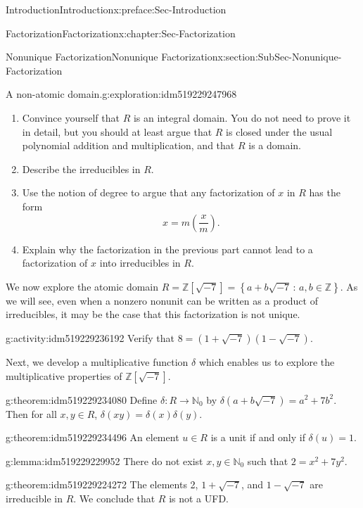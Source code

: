 \documentclass[oneside,10pt,]{book}
\numberwithin{equation}{section}
\newcommand{\setof}[2]{{\left\{#1\,\colon\,#2\right\}}}
\def\Z{{\mathbb Z}}
\def\N{{\mathbb N}}
\begin{document}
\begin{preface}{Introduction}{}{Introduction}{}{}{x:preface:Sec-Introduction}
\begin{chapterptx}{Factorization}{}{Factorization}{}{}{x:chapter:Sec-Factorization}
\begin{sectionptx}{Nonunique Factorization}{}{Nonunique Factorization}{}{}{x:section:SubSec-Nonunique-Factorization}
\begin{exploration}{A non-atomic domain.}{g:exploration:idm519229247968}
\begin{enumerate}
\item{}Convince yourself that \(R\) is an integral domain. You do not need to prove it in detail, but you should at least argue that \(R\) is closed under the usual polynomial addition and multiplication, and that \(R\) is a domain.%
\item{}Describe the irreducibles in \(R\).%
\item{}Use the notion of degree to argue that any factorization of \(x\) in \(R\) has the form%
\begin{equation*}
x = m\left(\frac{x}{m}\right).
\end{equation*}
%
\item{}Explain why the factorization in the previous part cannot lead to a factorization of \(x\) into irreducibles in \(R\).%
\end{enumerate}
\end{exploration}
We now explore the atomic domain \(R = \Z[\sqrt{-7}] = \setof{a+b\sqrt{-7}}{a,b\in\Z}\). As we will see, even when a nonzero nonunit can be written as a product of irreducibles, it may be the case that this factorization is not unique.%
\begin{activity}{}{g:activity:idm519229236192}%
Verify that \(8 = (1+\sqrt{-7})(1-\sqrt{-7})\).%
\end{activity}
Next, we develop a multiplicative function \(\delta\) which enables us to explore the multiplicative properties of \(\Z[\sqrt{-7}]\).%
\begin{theorem}{}{}{g:theorem:idm519229234080}%
Define \(\delta : R \to \N_0\) by \(\delta(a+b\sqrt{-7}) = a^2 + 7 b^2\). Then for all \(x,y\in R\), \(\delta(xy) = \delta(x)\delta(y)\).%
\end{theorem}
\begin{theorem}{}{}{g:theorem:idm519229234496}%
An element \(u\in R\) is a unit if and only if \(\delta(u) = 1\).%
\end{theorem}
\begin{lemma}{}{}{g:lemma:idm519229229952}%
There do not exist \(x,y\in \N_0\) such that \(2 = x^2 + 7y^2\).%
\end{lemma}
\begin{theorem}{}{}{g:theorem:idm519229224272}%
The elements 2, \(1+ \sqrt{-7}\), and \(1-\sqrt{-7}\) are irreducible in \(R\). We conclude that \(R\) is not a UFD.%
\end{theorem}
\end{sectionptx}
\end{chapterptx}
%
%


\end{preface}
\end{document}
